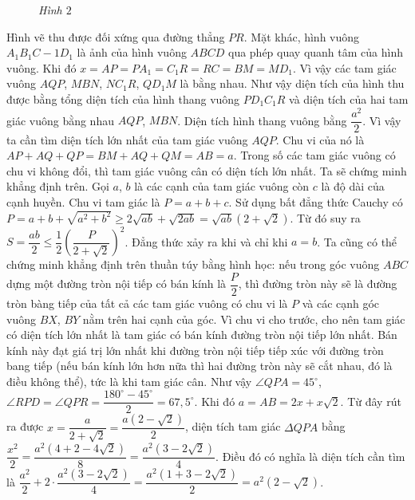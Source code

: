 \begin{multicols}{2}
\begin{figure}[H]
		\caption{\small\textit{\color{cackithi}Hình $2$}}
		\vspace*{-10pt}
	\end{figure}
	Hình vẽ thu được đối xứng qua đường thẳng $PR$. Mặt khác, hình vuông $A_1B_1C-1D_1$ là ảnh của hình vuông $ABCD$ qua phép quay quanh tâm của hình vuông. Khi đó  $x = AP = P{A_1} = {C_1}R = RC = BM = M{D_1}$. Vì vậy các tam giác vuông  $AQP$,  $MBN$,  $NC_1R$, $QD_1M$ là bằng nhau. 
	\vskip 0.1cm
	Như vậy diện tích của hình thu được bằng tổng diện tích của hình thang vuông $PD_1C_1R$ và diện tích của hai tam giác vuông bằng nhau  $AQP$,  $MBN$. Diện tích hình thang vuông bằng  $\dfrac{a^2}{2}$. Vì vậy ta cần tìm diện tích lớn nhất của tam giác vuông $AQP$. Chu vi của nó là $AP + AQ + QP = BM + AQ + QM = AB = a$. Trong số các tam giác vuông có chu vi không đổi, thì tam giác vuông cân có diện tích lớn nhất.
	\vskip 0.1cm
	Ta sẽ chứng minh khẳng định trên. Gọi $a$, $b$ là các cạnh của tam giác vuông còn $c$ là độ dài của cạnh huyền. Chu vi tam giác là $P = a + b + c$. Sử dụng bất đẳng thức Cauchy có $P = a + b + \sqrt {{a^2} + {b^2}}  \ge 2\sqrt {ab}  + \sqrt {2ab}  = \sqrt {ab} \left( {2 + \sqrt 2 } \right)$. Từ đó suy ra $S = \dfrac{{ab}}{2} \le \dfrac{1}{2}{\left( {\dfrac{P}{{2 + \sqrt 2 }}} \right)^2}$. Đẳng thức xảy ra khi và chỉ khi $a = b$.
	\vskip 0.1cm 
	Ta cũng có thể chứng minh khẳng định trên thuần túy bằng hình học: nếu trong góc vuông $ABC$ dựng một đường tròn nội tiếp có bán kính là $\dfrac{P}{2}$, thì đường tròn này sẽ là đường tròn bàng tiếp của tất cả các tam giác vuông có chu vi là $P$ và các cạnh góc vuông $BX$, $BY$ nằm trên hai cạnh của góc. Vì chu vi cho trước, cho nên tam giác có diện tích lớn nhất là tam giác có bán kính đường tròn nội tiếp lớn nhất. Bán kính này đạt giá trị lớn nhất khi đường tròn nội tiếp tiếp xúc với đường tròn bang tiếp (nếu bán kính lớn hơn nữa thì hai đường tròn này sẽ cắt nhau, đó là điều không thể), tức là khi tam giác cân. 
	Như vậy  $\angle QPA = 45^\circ$, $\angle RPD = \angle QPR = \dfrac{180^\circ - 45^\circ}{2} = 67,5^\circ$. Khi đó $a = AB = 2x + x\sqrt 2 $. Từ đây rút ra được $x = \dfrac{a}{{2 + \sqrt 2 }} = \dfrac{{a\left( {2 - \sqrt 2 } \right)}}{2}$, diện tích tam giác $\Delta QPA$  bằng $\dfrac{{{x^2}}}{2} = \dfrac{{{a^2}\left( {4 + 2 - 4\sqrt 2 } \right)}}{8} = \dfrac{{{a^2}\left( {3 - 2\sqrt 2 } \right)}}{4}$. Điều đó có nghĩa là diện tích cần tìm là $\dfrac{{{a^2}}}{2} + 2 \cdot \dfrac{{{a^2}\left( {3 - 2\sqrt 2 } \right)}}{4} = \dfrac{{{a^2}\left( {1 + 3 - 2\sqrt 2 } \right)}}{2} = {a^2}\left( {2 - \sqrt 2 } \right)$.
	\vskip 0.1cm 

\end{multicols}
